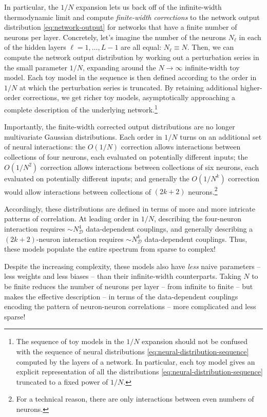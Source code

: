 \documentclass[12pt]{article}
\begin{document}
In particular, the $1/N$ expansion lets us back off of the infinite-width thermodynamic limit and compute \emph{finite-width corrections} to the network output distribution \eqref{eq:network-output} for networks that have a finite number of neurons per layer. Concretely, let's imagine the number of the neurons $N_\ell$ in each of the hidden layers $\ell = 1, \dots, L-1$ are all equal: $N_\ell \equiv N $. Then, we can compute the network output distribution by working out a perturbation series in the small parameter $1/N$, expanding around the $N\to \infty$ infinite-width toy model. Each toy model in the sequence is then defined according to the order in $1/N$ at which the perturbation series is truncated. By retaining additional higher-order corrections, we get richer toy models, asymptotically approaching a complete description of the underlying network.\footnote{
    The sequence of toy models in the $1/N$ expansion should not be confused with the sequence of neural distributions \eqref{eq:neural-distribution-sequence} computed by the layers of a network. In particular, each toy model gives an explicit representation of all the distributions \eqref{eq:neural-distribution-sequence} truncated to a fixed power of $1/N$.
}

Importantly, the finite-width corrected output distributions are no longer multivariate Gaussian distributions. Each order in $1/N$ turns on an additional set of neural interactions: the $O(1/N)$ correction allows interactions between collections of four neurons, each evaluated on potentially different inputs; the $O(1/N^2)$ correction allows interactions between collections of six neurons, each evaluated on potentially different inputs; and generally the $O(1/N^k)$ correction would allow interactions between collections of $(2k+2)$ neurons.\footnote{
    For a technical reason, there are only interactions between even numbers of neurons.
}

Accordingly, these distributions are defined in terms of more and more intricate patterns of correlation. At leading order in $1/N$, describing the four-neuron interaction requires $\sim N_{\mathcal{D}}^4$ data-dependent couplings, and generally describing a $(2k+2)$-neuron interaction requires $\sim N_{\mathcal{D}}^k$ data-dependent couplings.
Thus, these models populate the entire spectrum from sparse to complex! 

Despite the increasing complexity, these models also have \emph{less} naive parameters -- less weights and less biases -- than their infinite-width counterparts. Taking $N$ to be finite reduces the number of neurons per layer -- from infinite to finite -- but makes the effective description -- in terms of the data-dependent couplings encoding the pattern of neuron-neuron correlations -- more complicated and less sparse! %
\end{document}
